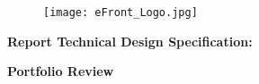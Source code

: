 \begin{figure}[ht]
    \centerline{\texttt{[image: eFront\_Logo.jpg]}}
    \end{figure}
    \vspace*{1cm}
\begin{huge}
    \textbf{Report Technical Design Specification:}
\end{huge}
    \vspace{0.5cm}
    \begin{center}
    \begin{Huge}
    \textbf {Portfolio Review}
    \end{Huge}
    \end{center}
     \vspace*{2.0cm}
     \begin{center}
    \author{Documented by Ahuatzi RIOS}
    \end{center}
    \pagebreak